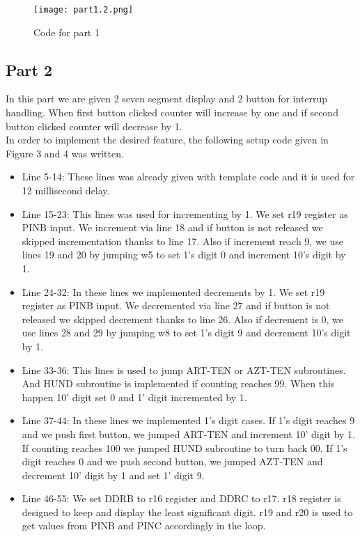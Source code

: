 \documentclass[pdftex,12pt,a4paper]{article}
\begin{document}
\begin{figure}[ht]
	\centering
	\texttt{[image: part1.2.png]}	
	\caption{Code for part 1}
	\label{fig1}
\end{figure}

\clearpage

\subsection{Part 2}
In this part we are given 2 seven segment display and 2 button for interrup handling. When first button clicked counter will increase by one
and if second button clicked counter will decrease by 1. \\
In order to implement the desired feature, the following setup code given in Figure 3 and 4 was written.\\

\begin{itemize}
    \item Line 5-14: These lines was already given with template code and it is used for 12 millisecond delay.
    \item Line 15-23: This lines was used for incrementing by 1. We set r19 register as PINB input. We increment via line 18 and if button is not released we skipped incrementation thanks to line 17. Also if increment reach 9, we use lines 19 and 20 by jumping w5 to set 1's digit 0 and increment 10's digit by 1.
    \item Line 24-32: In these lines we implemented decrements by 1. We set r19 register as PINB input. We decremented via line 27 and if button is not released we skipped decrement thanks to line 26. Also if decrement is 0, we use lines 28 and 29 by jumping w8 to set 1's digit 9 and decrement 10's digit by 1.
    \item Line 33-36: This lines is used to jump ART-TEN or AZT-TEN subroutines. And HUND subroutine is implemented if counting reaches 99. When this happen 10' digit set 0 and 1' digit incremented by 1.
    \item Line 37-44: In these lines we implemented 1's digit cases. If 1's digit reaches 9 and we push first button, we jumped ART-TEN and increment 10' digit by 1. If counting reaches 100 we jumped
    HUND subroutine to turn back 00. If 1's digit reaches 0 and we push second button, we jumped AZT-TEN and decrement 10' digit by 1 and set 1' digit 9.
    \item Line 46-55: We set DDRB to r16 register and DDRC to r17. r18 register is designed to keep and display the least significant digit. r19 and r20 is used to get values from PINB
     and PINC accordingly in the loop.
\end{itemize}
\end{document}

